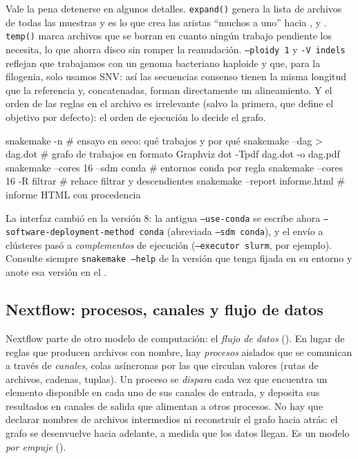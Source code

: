 Vale la pena detenerse en algunos detalles. \texttt{expand()} genera la lista de archivos de todas las muestras y es lo que crea las aristas ``muchos a uno'' hacia ,  y . \texttt{temp()} marca archivos que se borran en cuanto ningún trabajo pendiente los necesita, lo que ahorra disco sin romper la reanudación. \texttt{--ploidy 1} y \texttt{-V indels} reflejan que trabajamos con un genoma bacteriano haploide y que, para la filogenia, solo usamos SNV: así las secuencias consenso tienen la misma longitud que la referencia y, concatenadas, forman directamente un alineamiento. Y el orden de las reglas en el archivo es irrelevante (salvo la primera, que define el objetivo por defecto): el orden de ejecución lo decide el grafo.

\begin{consola}
snakemake -n                  # ensayo en seco: qué trabajos y por qué
snakemake --dag > dag.dot     # grafo de trabajos en formato Graphviz
dot -Tpdf dag.dot -o dag.pdf
snakemake --cores 16 --sdm conda   # entornos conda por regla
snakemake --cores 16 -R filtrar  # rehace filtrar y descendientes
snakemake --report informe.html    # informe HTML con procedencia
\end{consola}

\begin{cuidado}
La interfaz cambió en la versión 8: la antigua \texttt{--use-conda} se escribe ahora \texttt{--software-deployment-method conda} (abreviada \texttt{--sdm conda}), y el envío a clústeres pasó a \emph{complementos} de ejecución (\texttt{--executor slurm}, por ejemplo). Consulte siempre \texttt{snakemake --help} de la versión que tenga fijada en su entorno y anote esa versión en el .
\end{cuidado}

\subsection{Nextflow: procesos, canales y flujo de datos}

Nextflow \parencite{c18-ditommaso2017} parte de otro modelo de computación: el \emph{flujo de datos} (). En lugar de reglas que producen archivos con nombre, hay \emph{procesos} aislados que se comunican a través de \emph{canales}, colas asíncronas por las que circulan valores (rutas de archivos, cadenas, tuplas). Un proceso se \emph{dispara} cada vez que encuentra un elemento disponible en cada uno de sus canales de entrada, y deposita sus resultados en canales de salida que alimentan a otros procesos. No hay que declarar nombres de archivos intermedios ni reconstruir el grafo hacia atrás: el grafo se desenvuelve hacia adelante, a medida que los datos llegan. Es un modelo \emph{por empuje} ().

